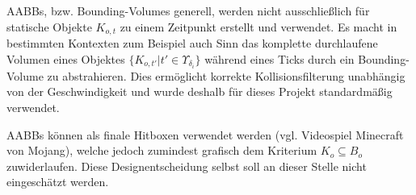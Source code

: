 AABBs, bzw. Bounding-Volumes generell, werden nicht ausschließlich für statische Objekte $K_{o,t}$ zu einem Zeitpunkt erstellt und verwendet. Es macht in bestimmten Kontexten zum Beispiel auch Sinn das komplette durchlaufene Volumen eines Objektes $\{K_{o,t'} | t' \in \Upsilon_{\delta_i}\}$ während eines Ticks durch ein Bounding-Volume zu abstrahieren. Dies ermöglicht korrekte Kollisionsfilterung unabhängig von der Geschwindigkeit und wurde deshalb für dieses Projekt standardmäßig verwendet.

AABBs können als finale Hitboxen verwendet werden (vgl. Videospiel Minecraft von Mojang), welche jedoch zumindest grafisch dem Kriterium $K_o \subseteq B_o$ zuwiderlaufen. Diese Designentscheidung selbst soll an dieser Stelle nicht eingeschätzt werden.
